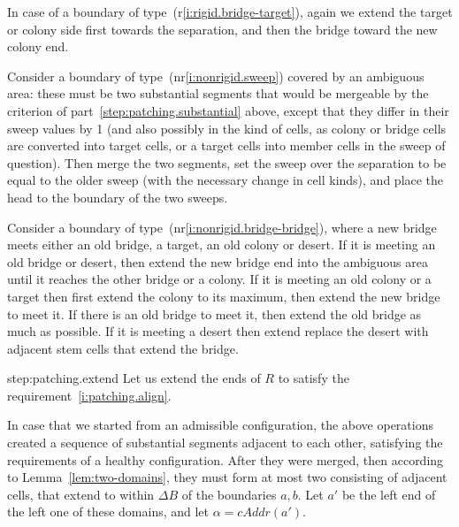 \documentclass[12pt]{memoir}
\newcommand{\fld}[1]{\ensuremath{\textit{#1}}}
\def\B{B}
\newcommand{\R}{R}
\newcommand{\cAddr}{\fld{cAddr}}
\begin{document}
\begin{Proof}
\begin{prooofi}
In case of a boundary of type~(r\ref{i:rigid.bridge-target}),
again we extend the target or colony side first towards the separation,
and then the bridge toward the new colony end.

Consider a boundary of type~(nr\ref{i:nonrigid.sweep}) covered by an ambiguous area:
these must be two substantial segments that would be mergeable by the criterion 
of part~\ref{step:patching.substantial} above, except that they
differ in their sweep values by 1 (and also possibly in the kind of cells,
as colony or bridge cells are converted into target cells, or a target cells into member cells
in the sweep of question).
Then merge the two segments, set the sweep over the separation to be equal
to the older sweep (with the necessary change in cell kinds), 
and place the head to the boundary of the two sweeps.

Consider a boundary of type~(nr\ref{i:nonrigid.bridge-bridge}), where a new bridge
meets either an old bridge, a target, an old colony or desert.
If it is meeting an old bridge or desert, then
extend the new bridge end into the ambiguous area until it reaches the
other bridge or a colony.
If it is meeting an old colony or a target then first extend the colony to its maximum,
then extend the new bridge to meet it.
If there is an old bridge to meet it, then extend the old bridge as much as possible.
If it is meeting a desert then extend replace the desert with adjacent 
stem cells that extend the bridge.
\end{prooofi} %

\begin{step+}{step:patching.extend}
  Let us extend the ends of \( \R \) to satisfy the requirement~\eqref{i:patching.align}.
\end{step+}
\begin{prooofi}
In case that we started from an admissible configuration, the above operations
created a sequence of substantial segments adjacent to each other, satisfying the 
requirements of a healthy configuration.
After they were merged, then according to Lemma~\ref{lem:two-domains},
they must form at most two  consisting of adjacent cells, that extend
to within \( \Delta\B \) of the boundaries \( a,b \).
Let \( a' \) be the left end of the left one of these domains, and let \( \alpha=\cAddr(a') \).


\end{prooofi}
\end{Proof}
\end{document}
